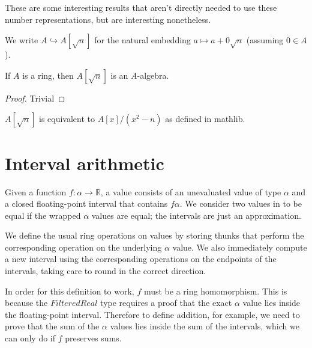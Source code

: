 These are some interesting results that aren't directly needed to use these
number representations, but are interesting nonetheless.


\begin{definition}
  \label{def:adjoinOfA}
  \leanok
  We write $A \hookrightarrow A[\sqrt{n}]$ for the natural embedding
  $a \mapsto a + 0\sqrt{n}$ (assuming $0 ∈ A$).
\end{definition}


\begin{lemma}
  \label{thm:adjoinAlgebra}
  \leanok
  If $A$ is a ring, then $A[\sqrt{n}]$ is an $A$-algebra.
\end{lemma}

\begin{proof}
  Trivial
  \leanok
\end{proof}

\begin{lemma}
  \label{thm:mathlibAdjoin}
  $A[\sqrt{n}]$ is equivalent to $A[x] / (x^2 - n)$ as defined in mathlib.
\end{lemma}

\section{Interval arithmetic}

\begin{definition}
  \label{def:filtered}
  \notready
  Given a function $f : α → ℝ$, a  value consists of
  an unevaluated value of type $α$ and a closed floating-point interval that
  contains $f α$. We consider two values in  to be
  equal if the wrapped $α$ values are equal; the intervals are just an
  approximation.
\end{definition}

\begin{definition}
  \label{def:filteredRingOps}
  We define the usual ring operations on  values by storing
  thunks that perform the corresponding operation on the underlying $α$ value.
  We also immediately compute a new interval using the corresponding operations
  on the endpoints of the intervals, taking care to round in the correct
  direction.

  In order for this definition to work, $f$ must be a ring homomorphism. This is
  because the $FilteredReal$ type requires a proof that the exact $α$ value lies
  inside the floating-point interval. Therefore to define addition, for example,
  we need to prove that the sum of the $α$ values lies inside the sum of the
  intervals, which we can only do if $f$ preserves sums.
\end{definition}

